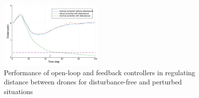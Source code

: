 \begin{figure}[t]
	\centering
	\includegraphics[width=0.45\textwidth]{figures/dist.pdf}
	\caption{Performance of open-loop and feedback controllers in regulating distance between drones for disturbance-free and perturbed situations}
\end{figure}\label{fig:multi_drone_distance}


